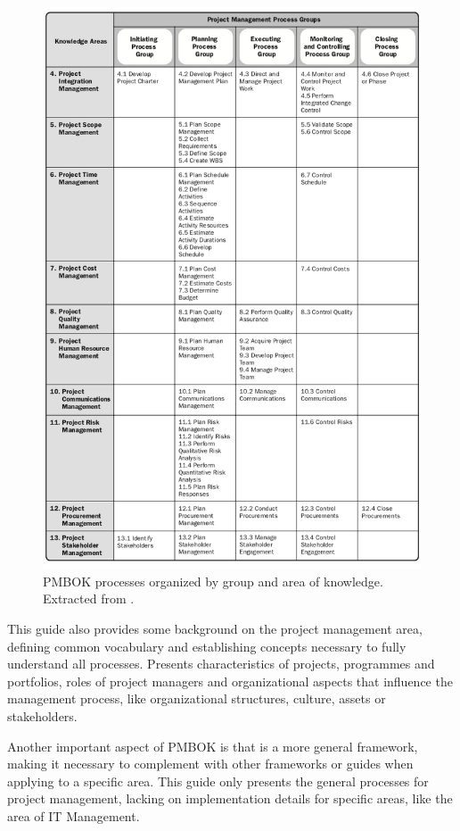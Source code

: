 \begin{figure}
\centering
\includegraphics[width=\textwidth]{img/PMBOKprocesses.png}
\caption{PMBOK processes organized by group and area of knowledge. Extracted from \cite{pmbok5}.}
\end{figure}


This guide also provides some background on the project management area, defining common vocabulary and establishing concepts necessary to fully understand all processes. Presents characteristics of projects, programmes and portfolios, roles of project managers and organizational aspects that influence the management process, like organizational structures, culture, assets or stakeholders.\par 
Another important aspect of PMBOK is that is a more general framework, making it necessary to complement with other frameworks or guides when applying to a specific area. This guide only presents the general processes for project management, lacking on implementation details for specific areas, like the area of IT Management.\par 

